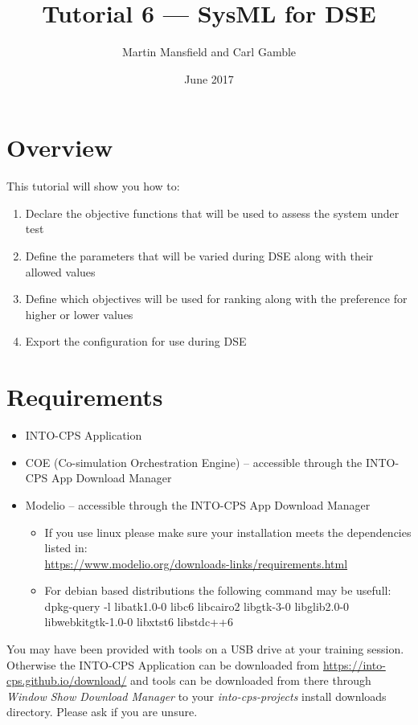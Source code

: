 \documentclass[11pt,a4paper]{../tutorial}
\title{Tutorial 6 --- SysML for DSE}
\date{June 2017}
\author{Martin Mansfield and Carl Gamble}
\begin{document}
\section*{Overview}

This tutorial will show you how to:

\begin{enumerate}[noitemsep]
\item Declare the objective functions that will be used to assess the system under test
\item Define the parameters that will be varied during DSE along with their allowed values
\item Define which objectives will be used for ranking along with the preference for higher or lower values
\item Export the configuration for use during DSE
\end{enumerate}

\section*{Requirements}

\begin{itemize}[noitemsep]
	\item INTO-CPS Application
	\item COE (Co-simulation Orchestration Engine) -- accessible through the INTO-CPS App Download Manager
	\item Modelio -- accessible through the INTO-CPS App Download Manager
	\begin{small}
		\begin{itemize}
			\item If you use linux please make sure your installation meets the dependencies listed in:\\ \url{https://www.modelio.org/downloads-links/requirements.html}
			\item For debian based distributions the following command may be usefull:\\
			dpkg-query -l  libatk1.0-0 libc6 libcairo2 libgtk-3-0 libglib2.0-0 libwebkitgtk-1.0-0 libxtst6 libstdc++6
		\end{itemize}
	\end{small}
\end{itemize}

You may have been provided with tools on a USB drive at your training session. Otherwise the INTO-CPS Application can be downloaded from \url{https://into-cps.github.io/download/} and tools can be downloaded from there through \emph{Window \menusep Show Download Manager} to your \emph{into-cps-projects} install downloads directory. Please ask if you are unsure.
\end{document}
